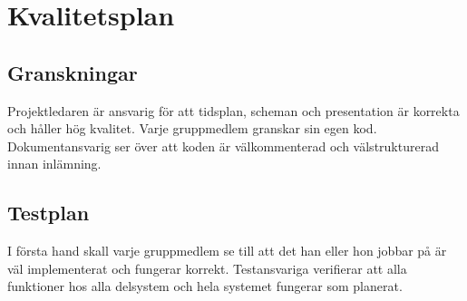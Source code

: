 \section{Kvalitetsplan}

\subsection{Granskningar}
Projektledaren är ansvarig för att tidsplan, scheman och presentation är korrekta och håller hög kvalitet. Varje gruppmedlem granskar sin egen kod. Dokumentansvarig ser över att koden är välkommenterad och välstrukturerad innan inlämning.

\subsection{Testplan}
I första hand skall varje gruppmedlem se till att det han eller hon jobbar på är väl implementerat och fungerar korrekt. Testansvariga verifierar att alla funktioner hos alla delsystem och hela systemet fungerar som planerat.
